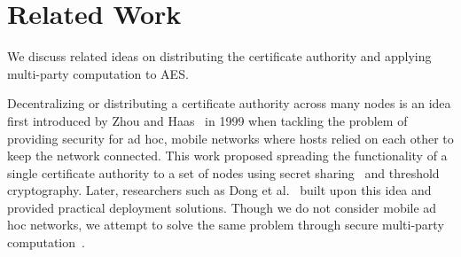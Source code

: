 \section{Related Work}\label{sec:related_works}
We discuss related ideas on distributing the certificate authority and applying multi-party computation to AES.

Decentralizing or distributing a certificate authority across many nodes is an idea first introduced by Zhou and Haas~\cite{zhou1999securing} in 1999 when tackling the problem of providing security for ad hoc, mobile networks where hosts relied on each other to keep the network connected. This work proposed spreading the functionality of a single certificate authority to a set of nodes using secret sharing~\cite{shamir1979share} and threshold cryptography. Later, researchers such as Dong et al.~\cite{dong2007providing} built upon this idea and provided practical deployment solutions. Though we do not consider mobile ad hoc networks, we attempt to solve the same problem through secure multi-party computation~\cite{yao1986generate}.

